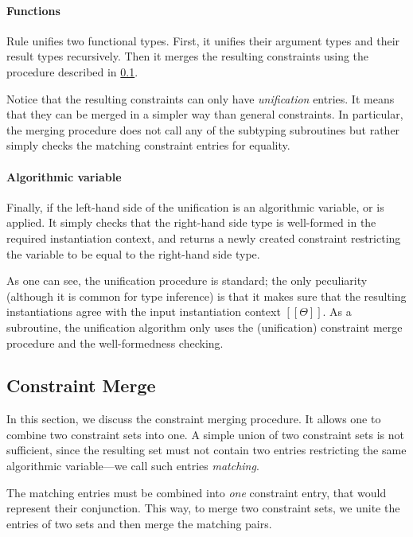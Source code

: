 \paragraph*{Functions}
  Rule  unifies two functional types. 
  First, it unifies their argument types and their result types recursively.
  Then it merges the resulting constraints using the procedure described in \cref{sec:constraint-merge}.

  Notice that the resulting constraints can only have \emph{unification}
  entries. It means that they can be merged in a simpler way than general
  constraints. In particular, the merging procedure does not call any of the
  subtyping subroutines but rather simply checks the matching constraint entries
  for equality.

\paragraph*{Algorithmic variable}
  Finally, if the left-hand side of the unification is an algorithmic variable,
   or  is applied. 
  It simply checks that the right-hand side type is well-formed in the required
  instantiation context, and returns a newly created constraint restricting the variable
  to be equal to the right-hand side type.

\vspace{\baselineskip}
As one can see, the unification procedure is standard; the only peculiarity
(although it is common for type inference) is that it makes sure that the resulting
instantiations agree with the input instantiation context $[[Θ]]$.  As a
subroutine, the unification algorithm only uses the (unification) constraint
merge procedure and the well-formedness checking.

\subsection{Constraint Merge}
\label{sec:constraint-merge}

In this section, we discuss the constraint merging procedure.
It allows one to combine two constraint sets into one. 
A simple union of two constraint sets is not sufficient, 
since the resulting set must not contain two entries restricting the 
same algorithmic variable---we call such entries \emph{matching}.

The matching entries must be combined into \emph{one} constraint entry, that
would represent their conjunction. This way, to merge two constraint sets, we
unite the entries of two sets and then merge the matching pairs.

